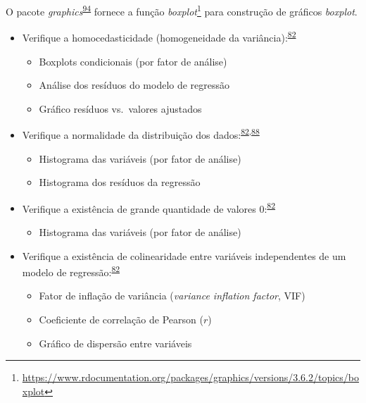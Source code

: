 \documentclass[
  a4paper,
]{book}
\providecommand{\tightlist}{%
  \setlength{\itemsep}{0pt}\setlength{\parskip}{0pt}}
\renewcommand{\href}[2]{#2\footnote{\url{#1}}}
\newenvironment{infobox}[1]
  {
  \begin{itemize}
  \renewcommand{\labelitemi}{
    \raisebox{-.7\height}[0pt][0pt]{
      {\setkeys{Gin}{width=3em,keepaspectratio}
        \texttt{[image: \#1]}}
    }
  }
  \setlength{\fboxsep}{1em}
  \begin{blackbox}
  \item
  }
  {
  \end{blackbox}
  \end{itemize}
  }
\begin{document}
\begin{infobox}{images/Rlogo}
O pacote \emph{graphics}\textsuperscript{\protect\hyperlink{ref-graphics}{94}} fornece a função \href{https://www.rdocumentation.org/packages/graphics/versions/3.6.2/topics/boxplot}{\emph{boxplot}} para construção de gráficos \emph{boxplot}.

\end{infobox}

\begin{itemize}
\item
  Verifique a homocedasticidade (homogeneidade da variância):\textsuperscript{\protect\hyperlink{ref-zuur2009}{82}}

  \begin{itemize}
  \item
    Boxplots condicionais (por fator de análise)
  \item
    Análise dos resíduos do modelo de regressão
  \item
    Gráfico resíduos vs.~valores ajustados
  \end{itemize}
\end{itemize}

\begin{itemize}
\item
  Verifique a normalidade da distribuição dos dados:\textsuperscript{\protect\hyperlink{ref-zuur2009}{82},\protect\hyperlink{ref-chatfield1986}{88}}

  \begin{itemize}
  \item
    Histograma das variáveis (por fator de análise)
  \item
    Histograma dos resíduos da regressão
  \end{itemize}
\end{itemize}

\begin{itemize}
\item
  Verifique a existência de grande quantidade de valores 0:\textsuperscript{\protect\hyperlink{ref-zuur2009}{82}}

  \begin{itemize}
  \tightlist
  \item
    Histograma das variáveis (por fator de análise)
  \end{itemize}
\end{itemize}

\begin{itemize}
\item
  Verifique a existência de colinearidade entre variáveis independentes de um modelo de regressão:\textsuperscript{\protect\hyperlink{ref-zuur2009}{82}}

  \begin{itemize}
  \item
    Fator de inflação de variância (\emph{variance inflation factor}, VIF)
  \item
    Coeficiente de correlação de Pearson (\(r\))
  \item
    Gráfico de dispersão entre variáveis
  \end{itemize}
\end{itemize}
\end{document}

